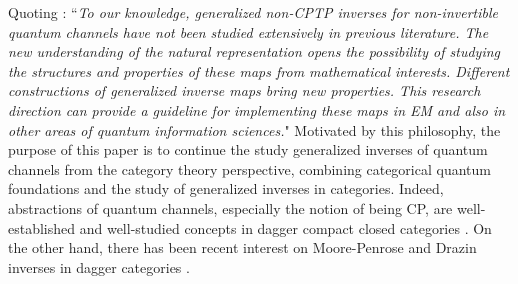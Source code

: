 \documentclass[submission,copyright,creativecommons]{eptcs}
\begin{document}


Quoting \cite{cao2021nisq}: ``{\em To our knowledge, generalized non-CPTP inverses for non-invertible quantum channels have not been studied extensively in previous literature. The new understanding of the natural representation opens the possibility of studying the structures and properties of these maps from mathematical interests. Different constructions of generalized inverse maps bring new properties. This research direction can provide a guideline for implementing these maps in EM and also in other areas of quantum information sciences.}" Motivated by this philosophy, the purpose of this paper is to continue the study generalized inverses of quantum channels from the category theory perspective, combining categorical quantum foundations and the study of generalized inverses in categories. Indeed, abstractions of quantum channels, especially the notion of being CP, are well-established and well-studied concepts in dagger compact closed categories \cite{coecke2016_cpinf,Coecke_2012,coecke2016categories,Cunningham_2015,Gogioso_2019,selinger2007dagger}. On the other hand, there has been recent interest on Moore-Penrose and Drazin inverses in dagger categories \cite{Cockett2023Moore,cockett2025dagger,cockett2024drazin,EPTCS426.3}. 
\end{document}

